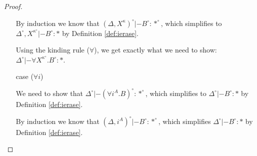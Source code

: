 \begin{proof}
\begin{itemize}
	By induction we know that
	$(\Delta,X^\kappa)^\circ |- B^\circ : *^\circ$,
	which simplifies to
	$\Delta^\circ,X^{\kappa^\circ} |- B^\circ : *$
	by Definition \ref{def:ierase}.

	Using the kinding rule ($\forall$), we get exactly
	what we need to show:
	$\Delta^\circ |- \forall X^{\kappa^\circ}.B^\circ : *$.

\item[case] ($\forall i$)

	We need to show that
	$\Delta^\circ |- (\forall i^A.B)^\circ : *^\circ$,
	which simplifies to $\Delta^\circ |- B^\circ : *$
	by Definition \ref{def:ierase}.

	By induction we know that
	$(\Delta,i^A)^\circ |- B^\circ : *^\circ$,
	which simplifies $\Delta^\circ |- B^\circ : *$
	by Definition \ref{def:ierase}.

\end{itemize}\vspace*{-10pt}
\end{proof}

